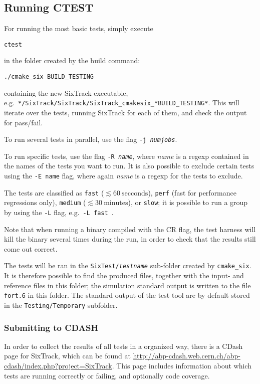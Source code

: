 \documentclass[english,BCOR=0mm,DIV=18]{scrartcl}
\begin{document}
\subsection{Running CTEST}
For running the most basic tests, simply execute
\begin{lstlisting}
ctest
\end{lstlisting}
in the folder created by the build command:
\begin{lstlisting}
./cmake_six BUILD_TESTING
\end{lstlisting}
containing the new SixTrack executable, e.g.\ \texttt{*/SixTrack/\-SixTrack/\-SixTrack\-\_cmakesix\-\_*BUILD\-\_TEST\-ING*}.
This will iterate over the tests, running SixTrack for each of them, and check the output for pass/fail.

To run several tests in parallel, use the flag \texttt{-j \textit{numjobs}}.

To run specific tests, use the flag \texttt{-R \textit{name}}, where \textit{name} is a regexp contained in the names of the tests you want to run.
It is also possible to exclude certain tests using the \texttt{-E \texttt{name}} flag, where again \textit{name} is a regexp for the tests to exclude.

The tests are classified as
\texttt{fast} ($\lesssim 60~\mathrm{secconds}$),
\texttt{perf} (fast for performance regressions only),
\texttt{medium} ($\lesssim 30~\mathrm{minutes}$),
or \texttt{slow}; it is possible to run a group by using the \texttt{-L} flag, e.g.\ \texttt{-L fast}~.

Note that when running a binary compiled with the CR flag, the test harness will kill the binary several times during the run, in order to check that the results still come out correct.

The tests will be ran in the \texttt{SixTest/\textit{testname}} sub-folder created by \texttt{cmake\_six}.
It is therefore possible to find the produced files, together with the input- and reference files in this folder; the simulation standard output is written to the file \texttt{fort.6} in this folder.
The standard output of the test tool are by default stored in the \texttt{Testing/Temporary} subfolder.

\subsubsection{Submitting to CDASH}
In order to collect the results of all tests in a organized way, there is a CDash page for SixTrack, which can be found at \url{http://abp-cdash.web.cern.ch/abp-cdash/index.php?project=SixTrack}.
This page includes information about which tests are running correctly or failing, and optionally code coverage.
\end{document}
